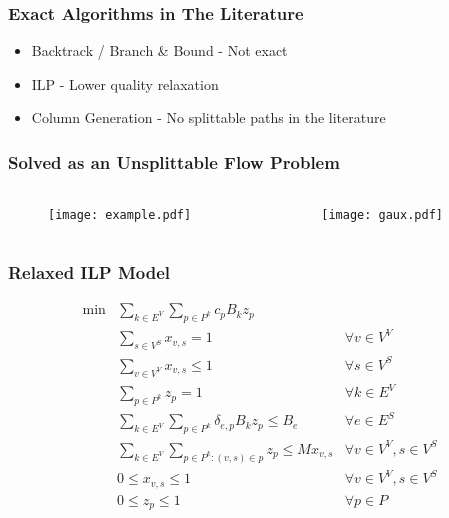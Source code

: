 \documentclass[english]{beamer}
\begin{document}
\begin{frame}
\frametitle{Exact Algorithms in The Literature}
\begin{itemize}
	\item Backtrack / Branch \& Bound \cite{Lischka2009} - Not exact
	\item ILP \cite{Chowdhury2010,Alkmim2013} - Lower quality relaxation
	\item Column Generation \cite{hu:2013} - No splittable paths in the literature
\end{itemize}
\end{frame}
\begin{frame}
\frametitle{Solved as an Unsplittable Flow Problem}
\begin{columns}
\begin{column}{0.45\textwidth}
  \begin{figure}
    \centering
    \texttt{[image: example.pdf]}
  \end{figure}
\end{column}
\begin{column}{0.45\textwidth}
  \begin{figure}
    \centering
    \texttt{[image: gaux.pdf]}
  \end{figure}
\end{column}
\end{columns}
\end{frame}
\begin{frame}
\frametitle{Relaxed ILP Model}
{\scriptsize
\begin{align}
  \min  & \sum\limits_{k \in E^{V}}\sum\limits_{p \in P^k}  c_{p} B_k z_{p} \nonumber \\
        & \sum\limits_{s \in V^{S}} x_{v,s} = 1                                  & \forall v \in V^{V} \label{eq:virone} \\
        & \sum\limits_{v \in V^{V}} x_{v,s} \leq 1                               & \forall s \in V^{S} \label{eq:subone} \\
        & \sum\limits_{p \in P^{k}} z_{p} = 1                                    & \forall k \in E^{V} \label{eq:virdemone} \\
        & \sum\limits_{k \in E^{V}}\sum\limits_{p \in P^{k}} \delta_{e,p} B_{k} z_{p} \leq B_{e} & \forall e \in E^{S} \label{eq:bandwidth} \\
        &  \sum\limits_{k \in E^{V}}\sum\limits_{p \in P^k : (v,s) \in p} z_{p} \leq M x_{v,s} & \forall v \in V^{V}, s \in V^{S} \label{eq:onlyoneaux}\\
        & 0 \leq x_{v,s} \leq 1  & \forall v \in V^{V}, s \in V^{S} \nonumber \\
        & 0 \leq z_{p}   \leq 1  & \forall p \in {P} \nonumber
\end{align}
}
\end{frame}
\end{document}
